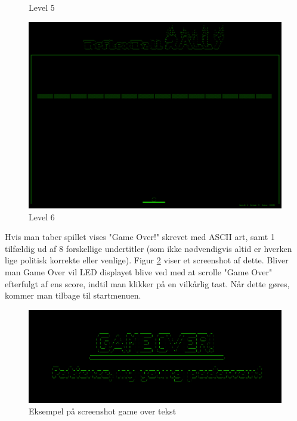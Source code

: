 \begin{figure}[H]
\begin{minipage}[b]{0.32\textwidth}
\caption{Level 5}
\label{fig:level5}
\end{minipage}\hfill
\begin{minipage}[b]{0.32\textwidth}
\includegraphics[width=\linewidth]{figs/screenshots/level6.png}
\caption{Level 6}
\label{fig:level6}
\end{minipage}\hfill
\end{figure}


Hvis man taber spillet vises "Game Over!" skrevet med ASCII art, samt 1 tilfældig ud af 8 forskellige undertitler (som ikke nødvendigvis altid er hverken lige politisk korrekte eller venlige). Figur \ref{fig:gameover_2} viser et screenshot af dette. Bliver man Game Over vil LED displayet blive ved med at scrolle "Game Over" efterfulgt af ens score, indtil man klikker på en vilkårlig tast. Når dette gøres, kommer man tilbage til startmenuen.\\

\begin{figure}[H]
\centering
\includegraphics[scale=0.25]{figs/screenshots/gameover_crop.png}
\caption{Eksempel på screenshot game over tekst}
\label{fig:gameover_2}
\end{figure}

